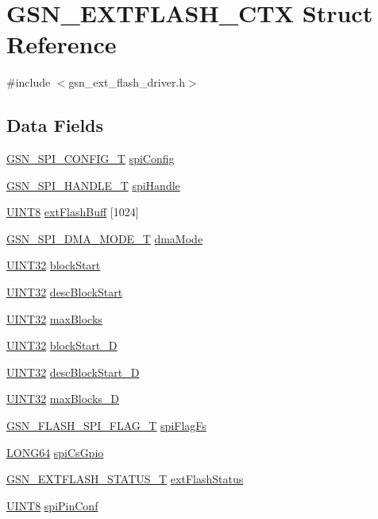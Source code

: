 \hypertarget{a00071}{
\section{GSN\_\-EXTFLASH\_\-CTX Struct Reference}
\label{a00071}
}


{\ttfamily \#include $<$gsn\_\-ext\_\-flash\_\-driver.h$>$}

\subsection*{Data Fields}
\begin{DoxyCompactItemize}
\item 
\hyperlink{a00231}{GSN\_\-SPI\_\-CONFIG\_\-T} \hyperlink{a00071_aaa45f93abc04d3ee7a70c0e8f5f382f3}{spiConfig}
\item 
\hyperlink{a00238}{GSN\_\-SPI\_\-HANDLE\_\-T} \hyperlink{a00071_a7e0135436cf308167541ff8fbb5756f4}{spiHandle}
\item 
\hyperlink{a00660_gab27e9918b538ce9d8ca692479b375b6a}{UINT8} \hyperlink{a00071_a8a0a12fc30e057410c37123d19ebaa55}{extFlashBuff} \mbox{[}1024\mbox{]}
\item 
\hyperlink{a00655_gafff743b26bbfafb380a9797457935a0e}{GSN\_\-SPI\_\-DMA\_\-MODE\_\-T} \hyperlink{a00071_a8745e343cad523631d63304871d0bdf3}{dmaMode}
\item 
\hyperlink{a00660_gae1e6edbbc26d6fbc71a90190d0266018}{UINT32} \hyperlink{a00071_a2f24f2d703080ebae9767dd0cf410be0}{blockStart}
\item 
\hyperlink{a00660_gae1e6edbbc26d6fbc71a90190d0266018}{UINT32} \hyperlink{a00071_a6f4dea133385a9141fa7080de63b65aa}{descBlockStart}
\item 
\hyperlink{a00660_gae1e6edbbc26d6fbc71a90190d0266018}{UINT32} \hyperlink{a00071_a20186b2859c047d77a5e408d04ec65fe}{maxBlocks}
\item 
\hyperlink{a00660_gae1e6edbbc26d6fbc71a90190d0266018}{UINT32} \hyperlink{a00071_ae4cf7019e5663b5821bf7d808e3b468a}{blockStart\_\-D}
\item 
\hyperlink{a00660_gae1e6edbbc26d6fbc71a90190d0266018}{UINT32} \hyperlink{a00071_afe80cbb45b9a6477d7b57db13aff5814}{descBlockStart\_\-D}
\item 
\hyperlink{a00660_gae1e6edbbc26d6fbc71a90190d0266018}{UINT32} \hyperlink{a00071_a4956629ef12bf230be1561d560f60d01}{maxBlocks\_\-D}
\item 
\hyperlink{a00496_ae69f658e2fd080c54a78eb23e4be2f59}{GSN\_\-FLASH\_\-SPI\_\-FLAG\_\-T} \hyperlink{a00071_a7d9aa824a9e4e0dfc141a119564b53aa}{spiFlagFs}
\item 
\hyperlink{a00660_gae57305825c7d329ad8a3065ae045e875}{LONG64} \hyperlink{a00071_af0db42ec8db8199a51522b74b520d5fe}{spiCsGpio}
\item 
\hyperlink{a00496_a880714aa4bccea65a8e3d427e9e395da}{GSN\_\-EXTFLASH\_\-STATUS\_\-T} \hyperlink{a00071_a3677ef907dd72b932f4c6fb1bbad5e7a}{extFlashStatus}
\item 
\hyperlink{a00660_gab27e9918b538ce9d8ca692479b375b6a}{UINT8} \hyperlink{a00071_a0ce711399524b300b375158a427b8888}{spiPinConf}
\end{DoxyCompactItemize}


